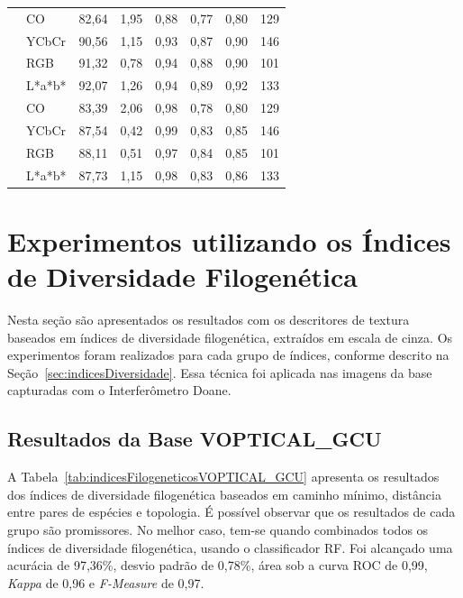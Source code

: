 \begin{table}[!ht]
{\begin{tabular}{llcccccc}
 & CO & 82,64 & 1,95 & 0,88 & 0,77 & 0,80 & 129 \\
 & YCbCr & 90,56 & 1,15 & 0,93 & 0,87 & 0,90 & 146 \\
 & RGB & 91,32 & 0,78 & 0,94 & 0,88 & 0,90 & 101 \\
 & L*a*b* & 92,07 & 1,26 & 0,94 & 0,89 & 0,92 & 133 \\ \cline{2-8} \parbox[t]{4mm}{}
 & CO & 83,39 & 2,06 & 0,98 & 0,78 & 0,80 & 129 \\
 & YCbCr & 87,54 & 0,42 & 0,99 & 0,83 & 0,85 & 146 \\
 & RGB & 88,11 & 0,51 & 0,97 & 0,84 & 0,85 & 101 \\
 & L*a*b* & 87,73 & 1,15 & 0,98 & 0,83 & 0,86 & 133 \\  
\end{tabular}
}
\end{table}
\FloatBarrier

\section{Experimentos utilizando os Índices de Diversidade Filogenética}
\label{sec:expKRipley}

Nesta seção são apresentados os resultados com os descritores de textura baseados em índices de diversidade filogenética, extraídos em escala de cinza. Os experimentos foram realizados para cada grupo de índices, conforme descrito na Seção~\ref{sec:indicesDiversidade}. Essa técnica foi aplicada nas imagens da base capturadas com o Interferômetro Doane.

\subsection{Resultados da Base VOPTICAL\_GCU}
\label{subsectionVOPTICAL_GCU}

A Tabela~\ref{tab:indicesFilogeneticosVOPTICAL_GCU} apresenta os resultados dos índices de diversidade filogenética baseados em caminho mínimo, distância entre pares de espécies e topologia. É possível observar que os resultados de cada grupo são promissores. No melhor caso, tem-se quando combinados todos os índices de diversidade filogenética, usando o classificador RF. Foi alcançado uma acurácia de 97,36\%, desvio padrão de 0,78\%, área sob a curva ROC de 0,99, \textit{Kappa} de 0,96 e \textit{F-Measure} de 0,97.

